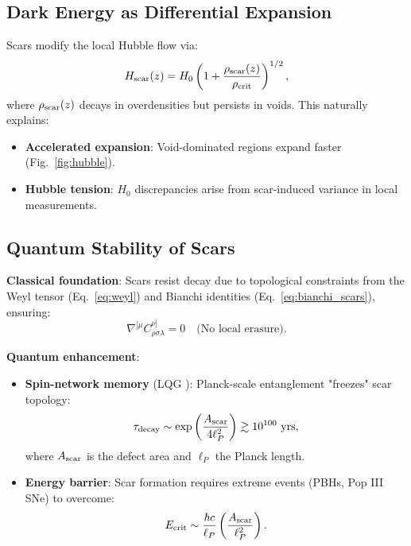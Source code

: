 \documentclass{article}
\begin{document}
\subsection{Dark Energy as Differential Expansion}  
Scars modify the local Hubble flow via:  
\begin{equation}  
H_{\rm scar}(z) = H_0 \left(1 + \frac{\rho_{\rm scar}(z)}{\rho_{\rm crit}}\right)^{1/2},  
\label{eq:hubble_scars}  
\end{equation}  
where $\rho_{\rm scar}(z)$ decays in overdensities but persists in voids. This naturally explains:  
\begin{itemize}  
  \item \textbf{Accelerated expansion}: Void-dominated regions expand faster (Fig.~\ref{fig:hubble}).  
  \item \textbf{Hubble tension}: $H_0$ discrepancies arise from scar-induced variance in local measurements.  
\end{itemize}  

\subsection{Quantum Stability of Scars}  
\label{sec:quantum}  

\textbf{Classical foundation}:  
Scars resist decay due to topological constraints from the Weyl tensor (Eq.~\ref{eq:weyl}) and Bianchi identities (Eq.~\ref{eq:bianchi_scars}), ensuring:  
\begin{equation}  
\nabla^{[\mu} C^{\nu]}_{\rho\sigma\lambda} = 0 \quad \text{(No local erasure)}.  
\end{equation}  

\textbf{Quantum enhancement}:  
\begin{itemize}  
    \item \textbf{Spin-network memory} (LQG \cite{Ashtekar2016}):  
    Planck-scale entanglement "freezes" scar topology:  
    \begin{equation}  
    \tau_{\rm decay} \sim \exp\left(\frac{A_{\rm scar}}{4\ell_P^2}\right) \gtrsim 10^{100} \text{ yrs},  
    \label{eq:decay}  
    \end{equation}  
    where $A_{\rm scar}$ is the defect area and $\ell_P$ the Planck length.  

    \item \textbf{Energy barrier}:  
    Scar formation requires extreme events (PBHs, Pop III SNe) to overcome:  
    \begin{equation}  
    E_{\rm crit} \sim \frac{\hbar c}{\ell_P} \left(\frac{A_{\rm scar}}{\ell_P^2}\right).  
    \label{eq:energy}  
    \end{equation}  
\end{itemize}  
\end{document}
